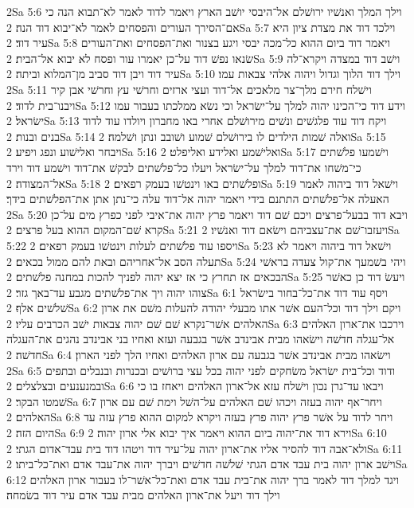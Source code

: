 2Sa 5:6  וילך המלך ואנשׁיו ירושׁלם אל־היבסי יושׁב הארץ ויאמר לדוד לאמר לא־תבוא הנה כי אם־הסירך העורים והפסחים לאמר לא־יבוא דוד הנה׃
2Sa 5:7  וילכד דוד את מצדת ציון היא עיר דוד׃
2Sa 5:8  ויאמר דוד ביום ההוא כל־מכה יבסי ויגע בצנור ואת־הפסחים ואת־העורים שׂנאו נפשׁ דוד על־כן יאמרו עור ופסח לא יבוא אל־הבית׃
2Sa 5:9  וישׁב דוד במצדה ויקרא־לה עיר דוד ויבן דוד סביב מן־המלוא וביתה׃
2Sa 5:10  וילך דוד הלוך וגדול ויהוה אלהי צבאות עמו׃
2Sa 5:11  וישׁלח חירם מלך־צר מלאכים אל־דוד ועצי ארזים וחרשׁי עץ וחרשׁי אבן קיר ויבנו־בית לדוד׃
2Sa 5:12  וידע דוד כי־הכינו יהוה למלך על־ישׂראל וכי נשׂא ממלכתו בעבור עמו ישׂראל׃
2Sa 5:13  ויקח דוד עוד פלגשׁים ונשׁים מירושׁלם אחרי באו מחברון ויולדו עוד לדוד בנים ובנות׃
2Sa 5:14  ואלה שׁמות הילדים לו בירושׁלם שׁמוע ושׁובב ונתן ושׁלמה׃
2Sa 5:15  ויבחר ואלישׁוע ונפג ויפיע׃
2Sa 5:16  ואלישׁמע ואלידע ואליפלט׃
2Sa 5:17  וישׁמעו פלשׁתים כי־משׁחו את־דוד למלך על־ישׂראל ויעלו כל־פלשׁתים לבקשׁ את־דוד וישׁמע דוד וירד אל־המצודה׃
2Sa 5:18  ופלשׁתים באו וינטשׁו בעמק רפאים׃
2Sa 5:19  וישׁאל דוד ביהוה לאמר האעלה אל־פלשׁתים התתנם בידי ויאמר יהוה אל־דוד עלה כי־נתן אתן את־הפלשׁתים בידך׃
2Sa 5:20  ויבא דוד בבעל־פרצים ויכם שׁם דוד ויאמר פרץ יהוה את־איבי לפני כפרץ מים על־כן קרא שׁם־המקום ההוא בעל פרצים׃
2Sa 5:21  ויעזבו־שׁם את־עצביהם וישׂאם דוד ואנשׁיו׃
2Sa 5:22  ויספו עוד פלשׁתים לעלות וינטשׁו בעמק רפאים׃
2Sa 5:23  וישׁאל דוד ביהוה ויאמר לא תעלה הסב אל־אחריהם ובאת להם ממול בכאים׃
2Sa 5:24  ויהי בשׁמעך את־קול צעדה בראשׁי הבכאים אז תחרץ כי אז יצא יהוה לפניך להכות במחנה פלשׁתים׃
2Sa 5:25  ויעשׂ דוד כן כאשׁר צוהו יהוה ויך את־פלשׁתים מגבע עד־באך גזר׃
2Sa 6:1  ויסף עוד דוד את־כל־בחור בישׂראל שׁלשׁים אלף׃
2Sa 6:2  ויקם וילך דוד וכל־העם אשׁר אתו מבעלי יהודה להעלות משׁם את ארון האלהים אשׁר־נקרא שׁם שׁם יהוה צבאות ישׁב הכרבים עליו׃
2Sa 6:3  וירכבו את־ארון האלהים אל־עגלה חדשׁה וישׂאהו מבית אבינדב אשׁר בגבעה ועזא ואחיו בני אבינדב נהגים את־העגלה חדשׁה׃
2Sa 6:4  וישׂאהו מבית אבינדב אשׁר בגבעה עם ארון האלהים ואחיו הלך לפני הארון׃
2Sa 6:5  ודוד וכל־בית ישׂראל משׂחקים לפני יהוה בכל עצי ברושׁים ובכנרות ובנבלים ובתפים ובמנענעים ובצלצלים׃
2Sa 6:6  ויבאו עד־גרן נכון וישׁלח עזא אל־ארון האלהים ויאחז בו כי שׁמטו הבקר׃
2Sa 6:7  ויחר־אף יהוה בעזה ויכהו שׁם האלהים על־השׁל וימת שׁם עם ארון האלהים׃
2Sa 6:8  ויחר לדוד על אשׁר פרץ יהוה פרץ בעזה ויקרא למקום ההוא פרץ עזה עד היום הזה׃
2Sa 6:9  וירא דוד את־יהוה ביום ההוא ויאמר איך יבוא אלי ארון יהוה׃
2Sa 6:10  ולא־אבה דוד להסיר אליו את־ארון יהוה על־עיר דוד ויטהו דוד בית עבד־אדום הגתי׃
2Sa 6:11  וישׁב ארון יהוה בית עבד אדם הגתי שׁלשׁה חדשׁים ויברך יהוה את־עבד אדם ואת־כל־ביתו׃
2Sa 6:12  ויגד למלך דוד לאמר ברך יהוה את־בית עבד אדם ואת־כל־אשׁר־לו בעבור ארון האלהים וילך דוד ויעל את־ארון האלהים מבית עבד אדם עיר דוד בשׂמחה׃
